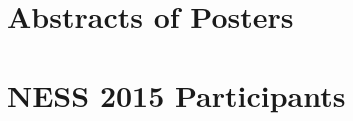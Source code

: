 \documentclass[12pts]{article}
\begin{document}
\section*{\centering Abstracts of Posters}


\newpage

\section*{\centering NESS 2015 Participants}
\begin{multicols}{2}
%

\end{multicols}
\end{document}
